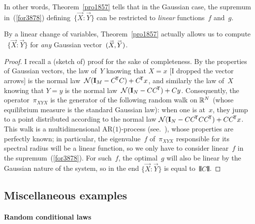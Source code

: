 \begin{Rmk}
In other words, Theorem~\ref{pro1857} tells that in the Gaussian case,
the supremum in~(\ref{for3878}) defining~${\{\vec{X}:\vec{Y}\}}$ can be restricted to \emph{linear} functions~$f$ and~$g$.
\end{Rmk}

\begin{Rmk}\label{rmk4919}
By a linear change of variables, Theorem~\ref{pro1857} actually allows us to compute%
~${\{\vec{X}:\vec{Y}\}}$ for \emph{any} Gaussian vector~$(\vec{X},\ab\vec{Y})$.
\end{Rmk}

\begingroup{}
\begin{proof}
I recall a (sketch of) proof for the sake of completeness.
%
By the properties of Gaussian vectors,
the law of~$Y$ knowing that ${X=x}$ [I dropped the vector arrows]
is the normal law~${\mathcal{N}(\mathbf{I}_M-C^{\mathsf{\!T}}C)}+C^{\mathsf{\!T}}x$,
and similarly the law of~$X$ knowing that ${Y=y}$
is the normal law~${\mathcal{N}(\mathbf{I}_N-CC^{\mathsf{\!T}})}+Cy$.
Consequently, the operator~$\pi_{XYX}$ is the generator
of the following random walk on $\mathbb{R}^N$
(whose equilibrium measure is the standard Gaussian law):
when one is at~$x$, they jump to a point distributed according to the normal law
$\mathcal{N}(\mathbf{I}_N-CC^{\mathsf{\!T}}CC^{\mathsf{\!T}})+CC^{\mathsf{\!T}}x$.
This walk is a multidimensional AR($1$)-process (see.~\cite[\S~2.6]{AR(1)}),
whose properties are perfectly known;
in particular, the eigenvalue~$f$ of~$\pi_{XYX}$ responsible for its spectral radius
will be a linear function,
so we only have to consider linear~$f$ in the supremum~(\ref{for3878}).
For such~$f$, the optimal~$g$ will also be linear
by the Gaussian nature of the system,
so in the end $\{\vec{X}:\vec{Y}\}$ is equal to~$\VERT C\VERT$.
\end{proof}\endgroup


\subsection{Miscellaneous examples}

\paragraph{Random conditional laws}

